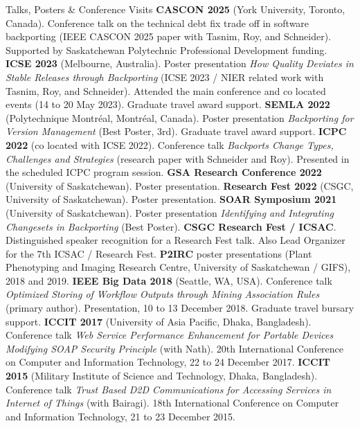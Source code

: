 \begin{rubric}{Talks, Posters \& Conference Visits}
\entry*[2025]%
	\textbf{CASCON 2025} (York University, Toronto, Canada). Conference talk on the technical debt fix trade off in software backporting (IEEE CASCON 2025 paper with Tasnim, Roy, and Schneider). Supported by Saskatchewan Polytechnic Professional Development funding.
\vspace{-1mm}
\entry*[2023]%
	\textbf{ICSE 2023} (Melbourne, Australia). Poster presentation \emph{How Quality Deviates in Stable Releases through Backporting} (ICSE 2023 / NIER related work with Tasnim, Roy, and Schneider). Attended the main conference and co located events (14 to 20 May 2023). Graduate travel award support.
\vspace{-1mm}
\entry*[2022a]%
	\textbf{SEMLA 2022} (Polytechnique Montr\'eal, Montr\'eal, Canada). Poster presentation \emph{Backporting for Version Management} (Best Poster, 3rd). Graduate travel award support.
\vspace{-1mm}
\entry*[2022b]%
	\textbf{ICPC 2022} (co located with ICSE 2022). Conference talk \emph{Backports Change Types, Challenges and Strategies} (research paper with Schneider and Roy). Presented in the scheduled ICPC program session.
\vspace{-1mm}
\entry*[2022c]%
	\textbf{GSA Research Conference 2022} (University of Saskatchewan). Poster presentation.
\vspace{-1mm}
\entry*[2022d]%
	\textbf{Research Fest 2022} (CSGC, University of Saskatchewan). Poster presentation.
\vspace{-1mm}
\entry*[2021]%
	\textbf{SOAR Symposium 2021} (University of Saskatchewan). Poster presentation \emph{Identifying and Integrating Changesets in Backporting} (Best Poster).
\vspace{-1mm}
\entry*[Local]%
	\textbf{CSGC Research Fest / ICSAC}. Distinguished speaker recognition for a Research Fest talk. Also Lead Organizer for the 7th ICSAC / Research Fest.
\vspace{-1mm}
\entry*[2018/19]%
	\textbf{P2IRC} poster presentations (Plant Phenotyping and Imaging Research Centre, University of Saskatchewan / GIFS), 2018 and 2019.
\vspace{-1mm}
\entry*[2018]%
	\textbf{IEEE Big Data 2018} (Seattle, WA, USA). Conference talk \emph{Optimized Storing of Workflow Outputs through Mining Association Rules} (primary author). Presentation, 10 to 13 December 2018. Graduate travel bursary support.
\vspace{-1mm}
\entry*[2017]%
	\textbf{ICCIT 2017} (University of Asia Pacific, Dhaka, Bangladesh). Conference talk \emph{Web Service Performance Enhancement for Portable Devices Modifying SOAP Security Principle} (with Nath). 20th International Conference on Computer and Information Technology, 22 to 24 December 2017.
\vspace{-1mm}
\entry*[2015]%
	\textbf{ICCIT 2015} (Military Institute of Science and Technology, Dhaka, Bangladesh). Conference talk \emph{Trust Based D2D Communications for Accessing Services in Internet of Things} (with Bairagi). 18th International Conference on Computer and Information Technology, 21 to 23 December 2015.
\end{rubric}
